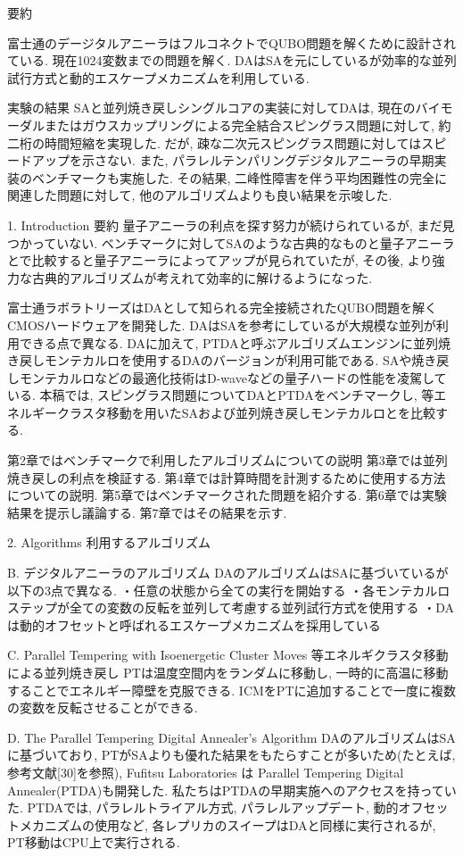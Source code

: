 要約

富士通のデージタルアニーラはフルコネクトでQUBO問題を解くために設計されている.
現在1024変数までの問題を解く. 
DAはSAを元にしているが効率的な並列試行方式と動的エスケープメカニズムを利用している. 

実験の結果
SAと並列焼き戻しシングルコアの実装に対してDAは, 現在のバイモーダルまたはガウスカップリングによる完全結合スピングラス問題に対して, 約二桁の時間短縮を実現した. 
だが, 疎な二次元スピングラス問題に対してはスピードアップを示さない. 
また, パラレルテンパリングデジタルアニーラの早期実装のベンチマークも実施した. 
その結果, 二峰性障害を伴う平均困難性の完全に関連した問題に対して, 他のアルゴリズムよりも良い結果を示唆した. 

1. Introduction 要約
量子アニーラの利点を探す努力が続けられているが, まだ見つかっていない. 
ベンチマークに対してSAのような古典的なものと量子アニーラとで比較すると量子アニーラによってアップが見られていたが, その後, より強力な古典的アルゴリズムが考えれて効率的に解けるようになった.

富士通ラボラトリーズはDAとして知られる完全接続されたQUBO問題を解くCMOSハードウェアを開発した. 
DAはSAを参考にしているが大規模な並列が利用できる点で異なる. 
DAに加えて, PTDAと呼ぶアルゴリズムエンジンに並列焼き戻しモンテカルロを使用するDAのバージョンが利用可能である. 
SAや焼き戻しモンテカルロなどの最適化技術はD-waveなどの量子ハードの性能を凌駕している. 
本稿では, スピングラス問題についてDAとPTDAをベンチマークし, 等エネルギークラスタ移動を用いたSAおよび並列焼き戻しモンテカルロとを比較する. 

第2章ではベンチマークで利用したアルゴリズムについての説明
第3章では並列焼き戻しの利点を検証する. 
第4章では計算時間を計測するために使用する方法についての説明. 
第5章ではベンチマークされた問題を紹介する. 
第6章では実験結果を提示し議論する. 
第7章ではその結果を示す. 

2. Algorithms 利用するアルゴリズム

B. デジタルアニーラのアルゴリズム
DAのアルゴリズムはSAに基づいているが以下の3点で異なる. 
・任意の状態から全ての実行を開始する
・各モンテカルロステップが全ての変数の反転を並列して考慮する並列試行方式を使用する
・DAは動的オフセットと呼ばれるエスケープメカニズムを採用している

C. Parallel Tempering with Isoenergetic Cluster Moves 等エネルギクラスタ移動による並列焼き戻し
PTは温度空間内をランダムに移動し, 一時的に高温に移動することでエネルギー障壁を克服できる. 
ICMをPTに追加することで一度に複数の変数を反転させることができる. 

D. The Parallel Tempering Digital Annealer's Algorithm
DAのアルゴリズムはSAに基づいており, PTがSAよりも優れた結果をもたらすことが多いため(たとえば, 参考文献[30]を参照), Fufitsu Laboratories は Parallel Tempering Digital Annealer(PTDA)も開発した. 
私たちはPTDAの早期実施へのアクセスを持っていた. 
PTDAでは, パラレルトライアル方式, パラレルアップデート, 動的オフセットメカニズムの使用など, 各レプリカのスイープはDAと同様に実行されるが, PT移動はCPU上で実行される. 


